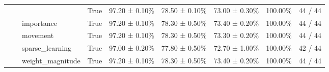 \begin{tabular}{lllllllll}
 &  &  & True & 97.20 ± 0.10\% & 78.50 ± 0.10\% & 73.00 ± 0.30\% & 100.00\% & 44 / 44 \\
\cline{3-9}
 &  & importance & True & 97.20 ± 0.10\% & 78.30 ± 0.50\% & 73.40 ± 0.20\% & 100.00\% & 44 / 44 \\
\cline{3-9}
 &  & movement & True & 97.20 ± 0.10\% & 78.30 ± 0.50\% & 73.30 ± 0.20\% & 100.00\% & 44 / 44 \\
\cline{3-9}
 &  & sparse\_learning & True & 97.00 ± 0.20\% & 77.80 ± 0.50\% & 72.70 ± 1.00\% & 100.00\% & 42 / 44 \\
\cline{3-9}
 &  & weight\_magnitude & True & 97.20 ± 0.10\% & 78.30 ± 0.50\% & 73.40 ± 0.20\% & 100.00\% & 44 / 44 \\
\cline{1-9} \cline{2-9} \cline{3-9}
\bottomrule
\end{tabular}
